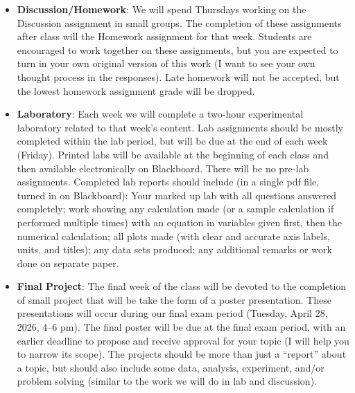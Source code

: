 \documentclass{article}
\begin{document}
\begin{itemize}
\item[] {\bf Discussion/Homework}:  We will spend Thursdays working on the Discussion assignment in small groups.  The completion of these assignments after class will the Homework assignment for that week.  Students are encouraged to work together on these assignments, but you are expected to turn in your own original version of this work (I want to see your own thought process in the responses). Late homework will not be accepted, but the lowest homework assignment grade will be dropped.

\thispagestyle{empty}
\newpage

\item[] {\bf Laboratory}: Each week we will complete a two-hour experimental laboratory related to that week's content.  Lab assignments should be mostly completed within the lab period, but will be due at the end of each week (Friday). Printed labs will be available at the beginning of each class and then available electronically on Blackboard.  There will be no pre-lab assignments.  Completed lab reports should include (in a single pdf file, turned in on Blackboard): Your marked up lab with all questions answered completely; work showing any calculation made (or a sample calculation if performed multiple times) with an equation in variables given first, then the numerical calculation; all plots made (with clear and accurate axis labels, units, and titles); any data sets produced; any additional remarks or work done on separate paper.

\item[] {\bf Final Project}: The final week of the class will be devoted to the completion of small project that will be take the form of a poster presentation. These presentations will occur during our final exam period (Tuesday, April 28, 2026, 4--6 pm).  The final poster will be due at the final exam period, with an earlier deadline to propose and receive approval for your topic (I will help you to narrow its scope).  The projects should be more than just a ``report'' about a topic, but should also include some data, analysis, experiment, and/or problem solving (similar to the work we will do in lab and discussion).



\end{itemize}
\end{document}
